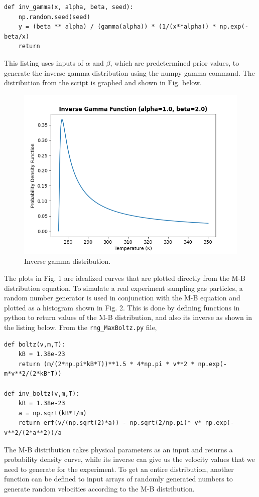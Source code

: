 \documentclass[%
 reprint,
 amsmath,amssymb,
 aps,
]{revtex4-2}
\begin{document}
\begin{lstlisting}
def inv_gamma(x, alpha, beta, seed):
    np.random.seed(seed)
    y = (beta ** alpha) / (gamma(alpha)) * (1/(x**alpha)) * np.exp(-beta/x)
    return
\end{lstlisting}

This listing uses inputs of $\alpha$ and $\beta$, which are predetermined prior values, to generate the inverse gamma distribution using the numpy gamma command. The distribution from the script is graphed and shown in Fig. below. 


\begin{figure}[h]
	\caption{Inverse gamma distribution.}
	\centering
	\includegraphics[scale=0.51]{inv_gamma.png}
\end{figure}


The plots in Fig. 1 are idealized curves that are plotted directly from the M-B distribution equation. To simulate a real experiment sampling gas particles, a random number generator is used in conjunction with the M-B equation and plotted as a histogram shown in Fig. 2. This is done by defining functions in python to return values of the M-B distribution, and also its inverse as shown in the listing below. From the \lstinline{rng_MaxBoltz.py} file,

\begin{lstlisting}
def boltz(v,m,T):
    kB = 1.38e-23
    return (m/(2*np.pi*kB*T))**1.5 * 4*np.pi * v**2 * np.exp(-m*v**2/(2*kB*T))

def inv_boltz(v,m,T):
    kB = 1.38e-23
    a = np.sqrt(kB*T/m)
    return erf(v/(np.sqrt(2)*a)) - np.sqrt(2/np.pi)* v* np.exp(-v**2/(2*a**2))/a
\end{lstlisting}
The M-B distribution takes physical parameters as an input and returns a probability density curve, while its inverse can give us the velocity values that we need to generate for the experiment. To get an entire distribution, another function can be defined to input arrays of randomly generated numbers to generate random velocities according to the M-B distribution.
\end{document}
